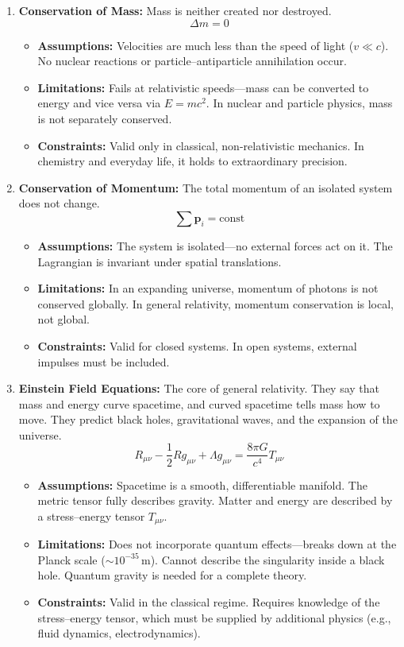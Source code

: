 \begin{enumerate}
\item \textbf{Conservation of Mass:} Mass is neither created nor destroyed.
\[
\Delta m=0
\]
\begin{itemize}
\item \textbf{Assumptions:} Velocities are much less than the speed of light ($v\ll c$). No nuclear reactions or particle--antiparticle annihilation occur.
\item \textbf{Limitations:} Fails at relativistic speeds---mass can be converted to energy and vice versa via $E=mc^2$. In nuclear and particle physics, mass is not separately conserved.
\item \textbf{Constraints:} Valid only in classical, non-relativistic mechanics. In chemistry and everyday life, it holds to extraordinary precision.
\end{itemize}

\item \textbf{Conservation of Momentum:} The total momentum of an isolated system does not change.
\[
\sum\mathbf p_i=\text{const}
\]
\begin{itemize}
\item \textbf{Assumptions:} The system is isolated---no external forces act on it. The Lagrangian is invariant under spatial translations.
\item \textbf{Limitations:} In an expanding universe, momentum of photons is not conserved globally. In general relativity, momentum conservation is local, not global.
\item \textbf{Constraints:} Valid for closed systems. In open systems, external impulses must be included.
\end{itemize}

\item \textbf{Einstein Field Equations:} The core of general relativity. They say that mass and energy curve spacetime, and curved spacetime tells mass how to move. They predict black holes, gravitational waves, and the expansion of the universe.
\[
R_{\mu\nu}-\frac12Rg_{\mu\nu}+\Lambda g_{\mu\nu}
=\frac{8\pi G}{c^4}T_{\mu\nu}
\]
\begin{itemize}
\item \textbf{Assumptions:} Spacetime is a smooth, differentiable manifold. The metric tensor fully describes gravity. Matter and energy are described by a stress--energy tensor $T_{\mu\nu}$.
\item \textbf{Limitations:} Does not incorporate quantum effects---breaks down at the Planck scale ($\sim10^{-35}$\,m). Cannot describe the singularity inside a black hole. Quantum gravity is needed for a complete theory.
\item \textbf{Constraints:} Valid in the classical regime. Requires knowledge of the stress--energy tensor, which must be supplied by additional physics (e.g., fluid dynamics, electrodynamics).
\end{itemize}


\end{enumerate}
